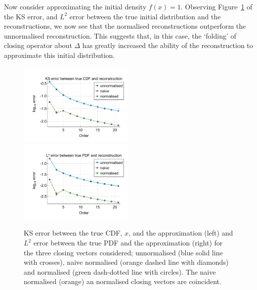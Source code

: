 Now consider approximating the initial density \(f(x)=1\). Observing Figure~\ref{fig: fun 4 ks error qbdrap closing vecs} of the KS error, and \(L^2\) error between the true initial distribution and the reconstructions, we now see that the normalised reconstructions outperform the unnormalised reconstruction. This suggests that, in this case, the `folding' of closing operator about \(\Delta\) has greatly increased the ability of the reconstruction to approximate this initial distribution. 
\begin{figure}
	\centering
	\includegraphics[width=0.5\textwidth,trim={1.25cm 0.8cm 0.25cm 1.25cm},clip]{chapter5/figs/qbdrap_closing_vec/fun4/ks_error_formatted.pdf}%
	\includegraphics[width=0.5\textwidth,trim={1.25cm 0.8cm 0.25cm 1.25cm},clip]{chapter5/figs/qbdrap_closing_vec/fun4/l2_pdf_error_formatted.pdf}
	\caption{KS error between the true CDF, \(x\), and the approximation (left) and \(L^2\) error between the true PDF and the approximation (right) for the three closing vectors considered; unnormalised (blue solid line with crosses), naive normalised (orange dashed line with diamonds) and normalised (green dash-dotted line with circles). The naive normalised (orange) an normalised closing vectors are coincident.}
	\label{fig: fun 4 ks error qbdrap closing vecs}
\end{figure}

